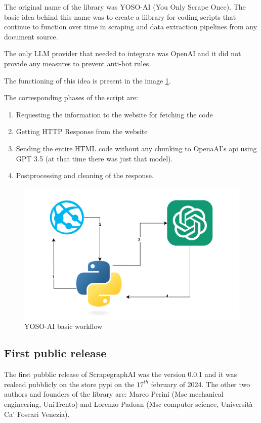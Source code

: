 The original name of the library was YOSO-AI (You Only Scrape Once). The basic idea behind this name was to create a liibrary for coding scripts that continue to function over time in scraping and data extraction pipelines from any document source.

The only LLM provider that needed to integrate was OpenAI and it did not provide any measures to prevent anti-bot rules.

The functioning of this idea is present in the image 
\ref{fig:yoso}.

The corresponding phases of the script are:
\begin{enumerate}
    \item Requesting the information to the website for fetching the code
    \item Getting HTTP Response from the website
    \item Sending the entire HTML code without any chunking to OpenaAI's api using GPT 3.5 (at that time there was just that model). 
    \item Postprocessing and cleaning of the response. 
\end{enumerate}

\begin{figure}[h!]
    \centering
    \includegraphics[scale=0.7]{Assets/YOSO.png}
    \caption{YOSO-AI basic workflow}
    \label{fig:yoso}
\end{figure}

\subsection{First public release}
The first pubblic release of ScrapegraphAI  was the version 0.0.1 and it was realead pubblicly on the store pypi on the $17^{th}$ february of 2024. The other two authors and founders of the library are: Marco Perini (Msc mechanical engineering, UniTrento) and Lorenzo Padoan (Msc computer science, Università Ca'​ Foscari Venezia).

